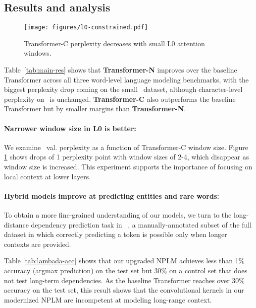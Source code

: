 \documentclass[11pt]{article}
\begin{document}
 \subsection{Results and analysis}

\begin{figure} [t]
\centering
     \texttt{[image: figures/l0-constrained.pdf]}
    \caption{ Transformer-C perplexity decreases with small L0 attention windows.
    }
    \label{fig:short-context-l0-constrain-1}
\end{figure}

Table~\ref{tab:main-res} shows that \textbf{Transformer-N} improves over the baseline Transformer across all three word-level language modeling benchmarks, with the biggest perplexity drop coming on the small \wttwo\ dataset, although character-level perplexity on \enwik\ is unchanged.  \textbf{Transformer-C} also outperforms the baseline Transformer but by smaller margins than \textbf{Transformer-N}. 

\paragraph{Narrower window size in L0 is better:}
We examine \wtthree\ val. perplexity as a function of Transformer-C window size. 
Figure \ref{fig:short-context-l0-constrain-1} shows drops of  1 perplexity point with window sizes of 2-4, which disappear as window size is increased. This experiment supports the importance of focusing on local context at lower layers. 


\paragraph{Hybrid models improve at predicting entities and rare words:}
To obtain a more fine-grained understanding of our models, we turn to the long-distance dependency prediction task in \lambada ~\cite{paperno-etal-2016-lambada}, a manually-annotated subset of the full dataset in which correctly predicting a token is possible only when longer contexts are provided.

Table \ref{tab:lambada-acc} shows that our upgraded NPLM achieves less than 1\% accuracy (argmax prediction) on the test set but 30\% on a control set that does not test long-term dependencies. As the baseline Transformer reaches over 30\% accuracy on the test set, this result shows that the convolutional kernels in our modernized NPLM are incompetent at modeling long-range context. 
\end{document}
